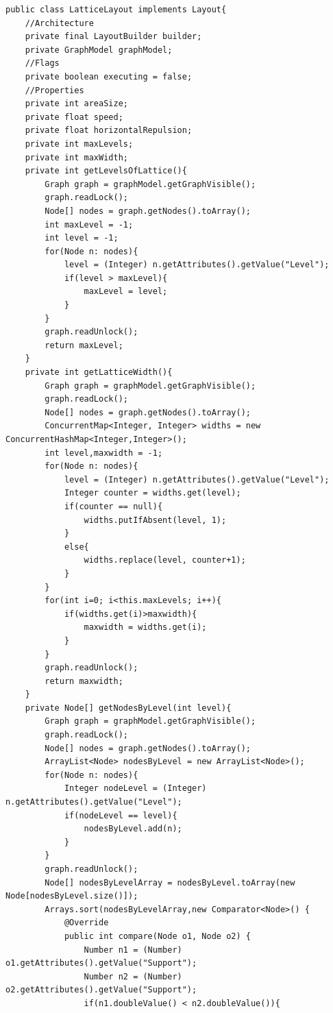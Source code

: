 \documentclass[12pt,oneside,letterpaper]{book}
\theoremstyle{definition}
\begin{document}
\begin{lstlisting}
public class LatticeLayout implements Layout{
    //Architecture
    private final LayoutBuilder builder;
    private GraphModel graphModel;
    //Flags
    private boolean executing = false;
    //Properties
    private int areaSize;
    private float speed;
    private float horizontalRepulsion;
    private int maxLevels;
    private int maxWidth;
    private int getLevelsOfLattice(){
        Graph graph = graphModel.getGraphVisible();
        graph.readLock();
        Node[] nodes = graph.getNodes().toArray();
        int maxLevel = -1;
        int level = -1;
        for(Node n: nodes){
            level = (Integer) n.getAttributes().getValue("Level");
            if(level > maxLevel){
                maxLevel = level;
            }
        }
        graph.readUnlock();
        return maxLevel;
    }
    private int getLatticeWidth(){
        Graph graph = graphModel.getGraphVisible();
        graph.readLock();
        Node[] nodes = graph.getNodes().toArray();
        ConcurrentMap<Integer, Integer> widths = new ConcurrentHashMap<Integer,Integer>();
        int level,maxwidth = -1;
        for(Node n: nodes){
            level = (Integer) n.getAttributes().getValue("Level");
            Integer counter = widths.get(level);
            if(counter == null){
                widths.putIfAbsent(level, 1);
            }
            else{
                widths.replace(level, counter+1);
            }
        }
        for(int i=0; i<this.maxLevels; i++){
            if(widths.get(i)>maxwidth){
                maxwidth = widths.get(i);
            }
        }
        graph.readUnlock();
        return maxwidth;
    }
    private Node[] getNodesByLevel(int level){
        Graph graph = graphModel.getGraphVisible();
        graph.readLock();
        Node[] nodes = graph.getNodes().toArray();
        ArrayList<Node> nodesByLevel = new ArrayList<Node>();
        for(Node n: nodes){
            Integer nodeLevel = (Integer) n.getAttributes().getValue("Level");
            if(nodeLevel == level){
                nodesByLevel.add(n);
            }
        }
        graph.readUnlock();
        Node[] nodesByLevelArray = nodesByLevel.toArray(new Node[nodesByLevel.size()]);
		Arrays.sort(nodesByLevelArray,new Comparator<Node>() {
            @Override
            public int compare(Node o1, Node o2) {
                Number n1 = (Number) o1.getAttributes().getValue("Support");
                Number n2 = (Number) o2.getAttributes().getValue("Support");
                if(n1.doubleValue() < n2.doubleValue()){

\end{lstlisting}
\end{document}
